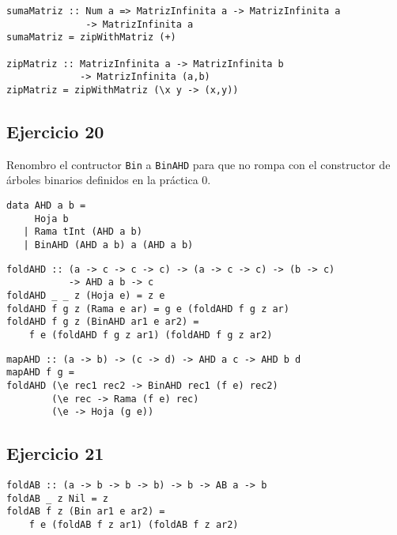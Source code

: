 \begin{centrado}
    \begin{verbatim}
sumaMatriz :: Num a => MatrizInfinita a -> MatrizInfinita a 
              -> MatrizInfinita a
sumaMatriz = zipWithMatriz (+)

zipMatriz :: MatrizInfinita a -> MatrizInfinita b 
             -> MatrizInfinita (a,b)
zipMatriz = zipWithMatriz (\x y -> (x,y))
    \end{verbatim}
\end{centrado}

\subsection{Ejercicio 20}
Renombro el contructor \texttt{Bin} a \texttt{BinAHD} para que no rompa con el constructor de árboles binarios definidos en la práctica 0.
\begin{centrado}
    \begin{verbatim}
data AHD a b = 
     Hoja b 
   | Rama tInt (AHD a b)
   | BinAHD (AHD a b) a (AHD a b)
    \end{verbatim}
\end{centrado}

\begin{centrado}
    \begin{verbatim}
foldAHD :: (a -> c -> c -> c) -> (a -> c -> c) -> (b -> c) 
           -> AHD a b -> c
foldAHD _ _ z (Hoja e) = z e
foldAHD f g z (Rama e ar) = g e (foldAHD f g z ar)
foldAHD f g z (BinAHD ar1 e ar2) =
    f e (foldAHD f g z ar1) (foldAHD f g z ar2)
    \end{verbatim}
\end{centrado}

\begin{centrado}
    \begin{verbatim}
mapAHD :: (a -> b) -> (c -> d) -> AHD a c -> AHD b d
mapAHD f g = 
foldAHD (\e rec1 rec2 -> BinAHD rec1 (f e) rec2)
        (\e rec -> Rama (f e) rec)
        (\e -> Hoja (g e))
    \end{verbatim}
\end{centrado}

\subsection{Ejercicio 21}
\begin{centrado}
    \begin{verbatim}
foldAB :: (a -> b -> b -> b) -> b -> AB a -> b
foldAB _ z Nil = z
foldAB f z (Bin ar1 e ar2) = 
    f e (foldAB f z ar1) (foldAB f z ar2)
    \end{verbatim}
\end{centrado}

